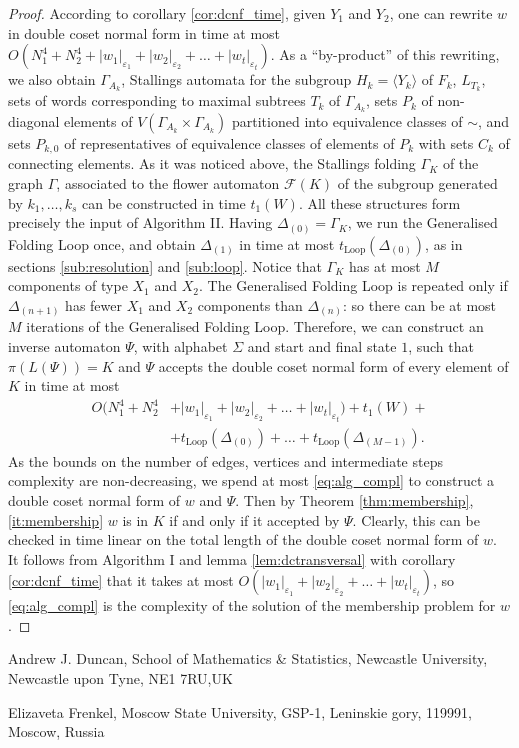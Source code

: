 \documentclass[a4paper,12pt]{article}
\newcommand{\G}{\Gamma }
\newcommand{\D}{\Delta }
\newcommand{\e}{\varepsilon }
\newcommand{\cF}{{\cal{F}}}
\numberwithin{equation}{section}
\numberwithin{figure}{section}
\newcommand{\Loop}{\operatorname{Loop}}
\renewcommand{\cF}{\mathcal{F}}
\newcommand{\la}{\langle}
\newcommand{\ra}{\rangle}
\begin{document}
\begin{proof}
According to corollary \ref{cor:dcnf_time}, given $Y_1$ and $Y_2$, one can rewrite $w$ in double coset normal form in time at most 
$O(N_1^4 + N_2^4+ |w_1|_{\e_1}+|w_2|_{\e_2}+
\ldots +|w_t|_{\e_t}).$
 As a ``by-product'' of this rewriting, we also obtain $\G_{A_k}$, Stallings automata for the subgroup $H_k=\la Y_k\ra$ of $F_k$,
$L_{T_k}$, sets of words corresponding to maximal subtrees $T_k$ of $\G_{A_k}$,  sets $P_k$ of non-diagonal elements of $V( \G_{A_k}\times \G_{A_k})$
partitioned into equivalence classes of $\sim$, and sets $P_{k,0}$ of representatives of equivalence classes of
elements of $P_k$ with sets $C_k$ of connecting elements. 
As it was noticed above, the Stallings folding $\G_K$ of the graph $\G$, associated to
the flower automaton $\cF(K)$ of the subgroup generated by $k_1, \ldots , k_s$ can be constructed in time  $t_1(W)$.
All these structures form precisely the input of Algorithm II. Having $\D_{(0)} = \G_K$, we run the Generalised Folding Loop once, and obtain $\D_{(1)}$ in time at most $t_{\Loop}(\D_{(0)})$, as in sections \ref{sub:resolution} and \ref{sub:loop}. 
Notice that $\G_K$ has at
most $M$ components of type $X_1$ and $X_2$.
 The Generalised Folding Loop is repeated
 only if $\D_{(n+1)}$ has fewer  $X_1$ and $X_2$ components
than $\D_{(n)}$: so there can be at most $M$ iterations of the Generalised
Folding Loop. Therefore, we can construct an inverse automaton 
 $\Psi$, with alphabet $\Sigma$ and start
and final state $1$, such that $\pi(L(\Psi))=K$ and $\Psi$ accepts the
double coset normal form of every element of $K$ in time at most 
\begin{align*}
O(N_1^4 + N_2^4 & + |w_1|_{\e_1}+|w_2|_{\e_2}+
\ldots +|w_t|_{\e_t})+ t_1(W) +\\ &+ t_{\Loop}(\D_{(0)}) + \ldots + t_{\Loop}(\D_{(M-1)}).
\end{align*}
As the bounds on the number of
edges, vertices and intermediate steps complexity are non-decreasing, we spend at most \eqref{eq:alg_compl} to construct a double coset normal form of $w$ and $\Psi$. 
Then by Theorem \ref{thm:membership}, \ref{it:membership} $w$ is in $K$ if and only if it accepted by $\Psi$. Clearly, this can be checked in time linear on the total length of the double coset normal form of $w$. It follows from Algorithm I and lemma \ref{lem:dctransversal} with corollary \ref{cor:dcnf_time} that it takes at most $O(|w_1|_{\e_1}+|w_2|_{\e_2}+
\ldots +|w_t|_{\e_t})$, so \eqref{eq:alg_compl} is the complexity of the solution of the membership problem for $w$.
\end{proof}




\medskip
\noindent\textsf{Andrew J. Duncan, School of Mathematics \&
Statistics, Newcastle University, Newcastle upon Tyne, NE1 7RU,UK}


\noindent \textsf{Elizaveta Frenkel, Moscow State University,
GSP-1, Leninskie gory, 119991, Moscow, Russia}

\end{document}
